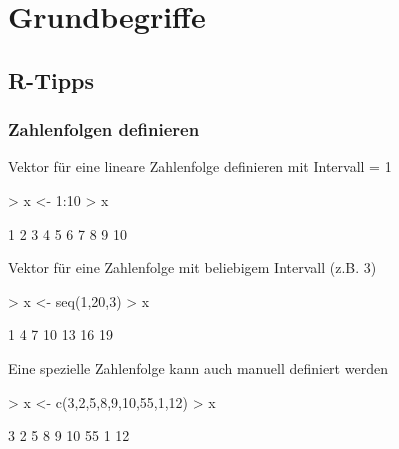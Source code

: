 



\section{Grundbegriffe}

\subsection{R-Tipps}
\subsubsection{Zahlenfolgen definieren}
Vektor für eine lineare Zahlenfolge definieren mit Intervall = 1
\begin{Schunk}
\begin{Sinput}
> x <- 1:10
> x
\end{Sinput}
\begin{Soutput}
 [1]  1  2  3  4  5  6  7  8  9 10
\end{Soutput}
\end{Schunk}
Vektor für eine Zahlenfolge mit beliebigem Intervall (z.B. 3)
\begin{Schunk}
\begin{Sinput}
> x <- seq(1,20,3)
> x
\end{Sinput}
\begin{Soutput}
[1]  1  4  7 10 13 16 19
\end{Soutput}
\end{Schunk}
Eine spezielle Zahlenfolge kann auch manuell definiert werden
\begin{Schunk}
\begin{Sinput}
> x <- c(3,2,5,8,9,10,55,1,12)
> x
\end{Sinput}
\begin{Soutput}
[1]  3  2  5  8  9 10 55  1 12
\end{Soutput}
\end{Schunk}

